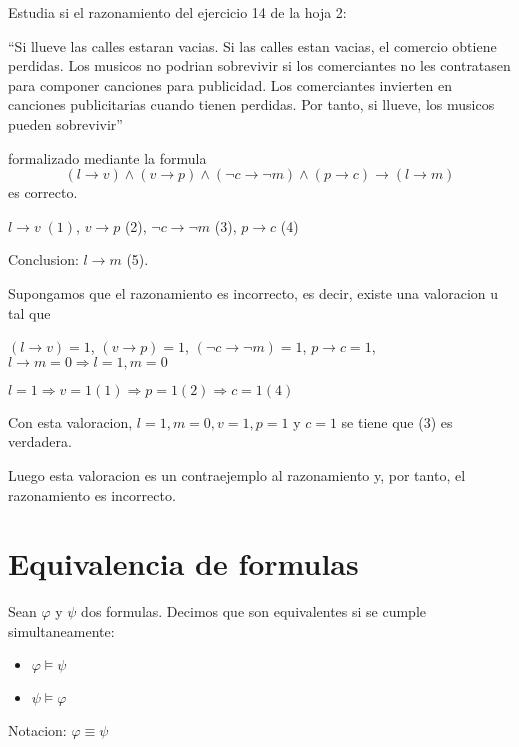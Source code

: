\begin{example}
	Estudia si el razonamiento del ejercicio 14 de la hoja 2:

	``Si llueve las calles estaran vacias. Si las calles estan vacias, el comercio obtiene perdidas. Los musicos no podrian sobrevivir si los comerciantes no les contratasen para componer canciones para publicidad. Los comerciantes invierten en canciones publicitarias cuando tienen perdidas. Por tanto, si llueve, los musicos pueden sobrevivir''

	formalizado mediante la formula
	\[
		(l \rightarrow v) \wedge (v \rightarrow p) \wedge (\neg c \rightarrow \neg m) \wedge (p \rightarrow c) \rightarrow (l \rightarrow m )
	\]
	es correcto.

	\(l \rightarrow v\; (1)\), \(v \rightarrow p \) (2), \(\neg c \rightarrow \neg m \) (3), \(p \rightarrow c\) (4)

	Conclusion: \(l \rightarrow m\) (5).

	Supongamos que el razonamiento es incorrecto, es decir, existe una valoracion u tal que

	\((l \rightarrow v) = 1\), \((v \rightarrow p) = 1\), \((\neg c \rightarrow \neg m) = 1\), \(p \rightarrow c = 1\), \(l \rightarrow m = 0 \Rightarrow l = 1, m = 0\)

	\(l = 1 \Rightarrow v = 1 (1) \Rightarrow p = 1 (2) \Rightarrow c = 1 (4)\)

	Con esta valoracion, \(l = 1, m = 0, v = 1, p = 1 \) y \(c = 1\) se tiene que (3) es verdadera.

	Luego esta valoracion es un contraejemplo al razonamiento y, por tanto, el razonamiento es incorrecto.
\end{example}

\section{Equivalencia de formulas}
\begin{definition}
	Sean \(\varphi\) y \(\psi \) dos formulas. Decimos que son equivalentes si se cumple simultaneamente:
	\begin{itemize}
		\item \(\varphi \models \psi \)
		\item \(\psi \models \varphi\)
	\end{itemize}
	Notacion: \(\varphi \equiv \psi\)
\end{definition}

